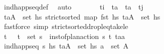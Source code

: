 \begin{isabellebody}
\ ind{\isacharunderscore}{\kern0pt}happ{\isacharunderscore}{\kern0pt}seq{\isacharunderscore}{\kern0pt}def\ \isamarkupfalse%
\ auto\isanewline
\ \ \ \ \isamarkupfalse%
\ \isamarkupfalse%
\ {\isachardoublequoteopen}t\isactrlsub i\ {\isacharless}{\kern0pt}\ t\isactrlsub a\ {\isasymand}\ t\isactrlsub a\ {\isacharless}{\kern0pt}\ t\isactrlsub j{\isachardoublequoteclose}\isanewline
\ \ \ \ \ \ \isamarkupfalse%
\ {\isacartoucheopen}{\isacharparenleft}{\kern0pt}t\isactrlsub a{\isacharcomma}{\kern0pt}A{\isacharparenright}{\kern0pt}\ {\isasymin}\ set\ {\isacharquery}{\kern0pt}hs\ {\isacartoucheopen}strict{\isacharunderscore}{\kern0pt}sorted\ {\isacharparenleft}{\kern0pt}map\ fst\ hs\ {\isacartoucheopen}{\isacharparenleft}{\kern0pt}t\isactrlsub a{\isacharcomma}{\kern0pt}A{\isacharparenright}{\kern0pt}\ {\isasymin}\ set\ hs\isanewline
\ \ \ \ \ \ \isamarkupfalse%
\ {\isacharparenleft}{\kern0pt}fastforce\ simp{\isacharcolon}{\kern0pt}\ strict{\isacharunderscore}{\kern0pt}sorted{\isacharunderscore}{\kern0pt}drop{\isacharunderscore}{\kern0pt}leq{\isacharunderscore}{\kern0pt}take{\isacharunderscore}{\kern0pt}le{\isacharprime}{\kern0pt}{\isacharparenright}{\kern0pt}\isanewline
\ \ \ \ \isamarkupfalse%
\ \isamarkupfalse%
\ t\isactrlsub {\isasympi}\ {\isasympi}\ \ {\isachardoublequoteopen}{\isacharparenleft}{\kern0pt}t\isactrlsub {\isasympi}{\isacharcomma}{\kern0pt}{\isasympi}{\isacharparenright}{\kern0pt}\ {\isasymin}\ set\ {\isasympi}s{\isachardoublequoteclose}\ \ {\isachardoublequoteopen}inst{\isacharunderscore}{\kern0pt}of{\isacharunderscore}{\kern0pt}plan{\isacharunderscore}{\kern0pt}action\ {\isasympi}s\ {\isacharparenleft}{\kern0pt}t\isactrlsub {\isasympi}{\isacharcomma}{\kern0pt}{\isasympi}{\isacharparenright}{\kern0pt}\ {\isacharparenleft}{\kern0pt}t\isactrlsub a{\isacharcomma}{\kern0pt}a{\isacharparenright}{\kern0pt}{\isachardoublequoteclose}\isanewline
\ \ \ \ \ \ \isamarkupfalse%
\ {\isacartoucheopen}ind{\isacharunderscore}{\kern0pt}happ{\isacharunderscore}{\kern0pt}seq\ {\isasympi}s\ hs\ {\isacartoucheopen}{\isacharparenleft}{\kern0pt}t\isactrlsub a{\isacharcomma}{\kern0pt}A{\isacharparenright}{\kern0pt}\ {\isasymin}\ set\ hs\ {\isacartoucheopen}a\ {\isasymin}\ set\ A{\isacartoucheclose}\isanewline

\end{isabellebody}
